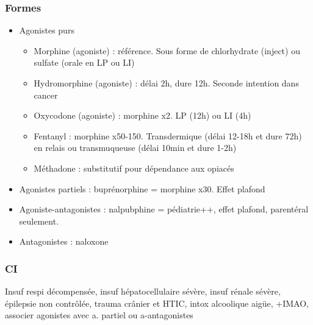 \documentclass[11pt]{article}
\begin{document}
\subsubsection{Formes}
\label{sec:org28d5248}
\begin{itemize}
\item Agonistes purs
\begin{itemize}
\item Morphine (agoniste) : référence. Sous forme de chlorhydrate (inject) ou
sulfate (orale en LP ou  LI)
\item Hydromorphine (agoniste) : délai 2h, dure 12h. Seconde intention dans cancer
\item Oxycodone (agoniste) : morphine x2. LP (12h) ou LI  (4h)
\item Fentanyl : morphine x50-150. Transdermique (délai 12-18h et dure 72h) en
relais ou transmuqueuse (délai 10min et dure 1-2h)
\item Méthadone : substitutif pour dépendance aux opiacés
\end{itemize}
\item Agonistes partiels : buprénorphine = morphine x30. Effet plafond
\item Agoniste-antagonistes : nalpubphine = pédiatrie++, effet plafond, parentéral
seulement.
\item Antagonistes : naloxone
\end{itemize}

\subsubsection{CI}
\label{sec:org0285a35}
Insuf respi décompensée, insuf hépatocellulaire sévère, insuf rénale sévère,
épilepsie non contrôlée, trauma crânier et HTIC, intox alcoolique aigüe, +IMAO,
associer agonistes avec a. partiel ou a-antagonistes
\end{document}
